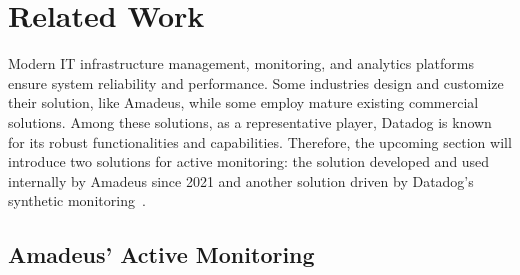 
\chapter{Related Work}\label{chapter:related_work}

Modern IT infrastructure management, monitoring, and analytics platforms ensure system reliability and performance. Some industries design and customize their solution, like Amadeus, while some employ mature existing commercial solutions. Among these solutions, as a representative player, Datadog is known for its robust functionalities and capabilities. Therefore, the upcoming section will introduce two solutions for active monitoring: the solution developed and used internally by Amadeus since 2021 and another solution driven by Datadog's synthetic monitoring~\parencite{datadogSyntheticMonitoring}. 

\section{Amadeus' Active Monitoring}

